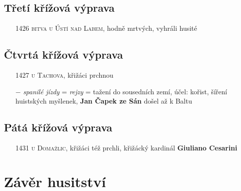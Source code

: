 \documentclass{article}
\begin{document}
\subsection*{Třetí křížová výprava}
\begin{itemize}
    \vspace{-0.5em}
    \setlength\itemsep{0.15em}
    \item[1426] \textsc{bitva u Ústí nad Labem}, hodně mrtvých, vyhráli husité
\end{itemize}


\subsection*{Čtvrtá křížová výprava}
\begin{itemize}
    \vspace{-0.5em}
    \setlength\itemsep{0.15em}
    \item[1427] \textsc{ u Tachova}, křižáci prchnou
\end{itemize}

\begin{itemize}
    \vspace{-0.5em}
    \setlength\itemsep{0.15em}
    \item[$-$] \textit{spanilé jízdy} = \textit{rejzy} = tažení do sousedních zemí, účel: kořist, šíření huistských myšlenek, \textbf{Jan Čapek ze Sán} došel až k Baltu
\end{itemize}

\subsection*{Pátá křížová výprava}
\begin{itemize}
    \vspace{-0.5em}
    \setlength\itemsep{0.15em}
    \item[1431] \textsc{ u Domažlic}, křižáci též prchli, křižácký kardinál \textbf{Giuliano Cesarini}
\end{itemize}

\section*{Závěr husitství}
\end{document}
